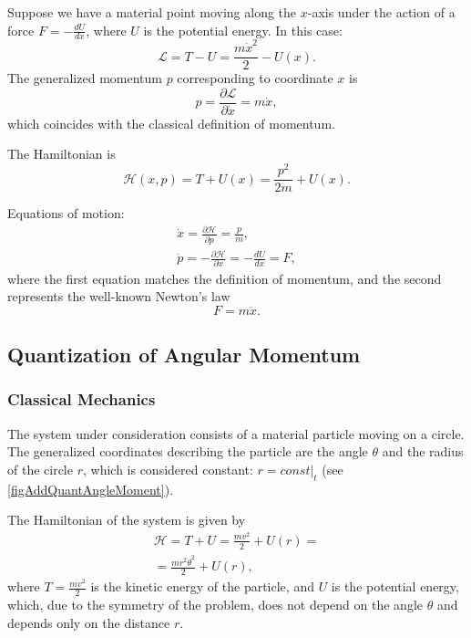 \begin{example}
Suppose we have a material point moving along the
$x$-axis under the action of a force $F = - \frac{d U}{d x}$, where $U$ is
the potential energy. In this case:
\[
\mathcal{L} = T - U = \frac{m \dot{x}^2}{2} - U(x).
\] 
The generalized momentum $p$ corresponding to coordinate $x$ is
\[
p = \frac{\partial \mathcal{L}}{\partial \dot{x}} = m \dot{x},
\]
which coincides with the classical definition of momentum.

The Hamiltonian is
\[
\mathcal{H}\left(x, p\right) = T + U(x) = \frac{p^2}{2 m} + U(x).
\]

Equations of motion:
\begin{eqnarray}
\dot{x} = \frac{\partial \mathcal{H}}{\partial p} = \frac{p}{m},
\nonumber \\
\dot{p} = - \frac{\partial \mathcal{H}}{\partial x} = - \frac{d U}{d
  x} = F,
\nonumber
\end{eqnarray}
where the first equation matches the definition of momentum, and the second
represents the well-known Newton's law
\[
F = m \ddot{x}.
\]
\end{example}

\subsection{Quantization of Angular Momentum}


 
\subsubsection{Classical Mechanics}
The system under consideration consists of a material particle moving on a
circle. The generalized coordinates describing the particle are the angle
$\theta$ and the radius of the circle $r$, which is considered constant: $r =
\left. const \right|_t$ (see \autoref{figAddQuantAngleMoment}).

The Hamiltonian of the system is given by
\begin{eqnarray}
\mathcal{H} = T + U = \frac{m v^2}{2} + U\left( r \right) = 
\nonumber \\
= \frac{m r^2 \dot{\theta}^2 }{2} + U\left( r \right),
\nonumber
\end{eqnarray}
where $T = \frac{m v^2}{2}$ is the kinetic energy of the particle,
and $U$ is the potential energy, which, due to the symmetry of the problem,
does not depend on the angle $\theta$ and depends only on the distance $r$.

